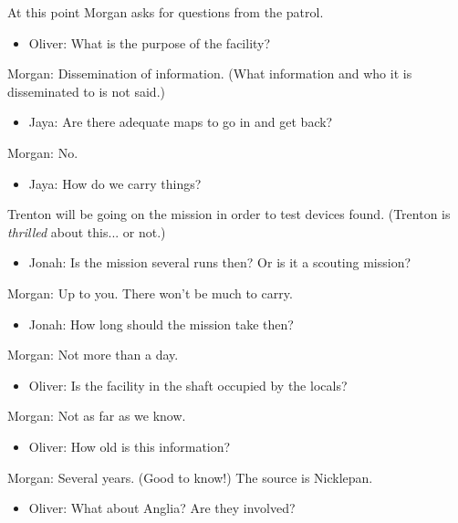At this point Morgan asks for questions from the patrol.
{
\parskip=0pt
\begin{itemize}
\item Oliver: What is the purpose of the facility?
\end{itemize}

Morgan: Dissemination of information.  (What information and who it is disseminated to is not said.)

\begin{itemize}
\item Jaya: Are there adequate maps to go in and get back?
\end{itemize}

Morgan: No.

\begin{itemize}
\item Jaya: How do we carry things?
\end{itemize}

Trenton will be going on the mission in order to test devices found.  (Trenton is\textit{ thrilled} about this... or not.)

\begin{itemize}
\item Jonah: Is the mission several runs then?  Or is it a scouting mission?
\end{itemize}

Morgan: Up to you.  There won't be much to carry.

\begin{itemize}
\item Jonah: How long should the mission take then?
\end{itemize}

Morgan: Not more than a day.

\begin{itemize}
\item Oliver: Is the facility in the shaft occupied by the locals?
\end{itemize}

Morgan: Not as far as we know.

\begin{itemize}
\item Oliver: How old is this information?
\end{itemize}

Morgan: Several years.  (Good to know!)  The source is Nicklepan.

\begin{itemize}
\item Oliver: What about Anglia?  Are they involved?
\end{itemize}

}
